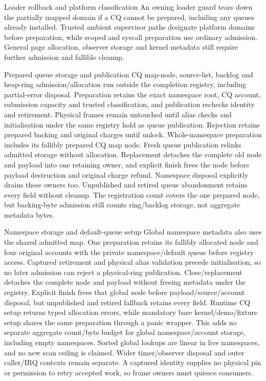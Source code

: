 \begin{implementationdetail}{Loader rollback and platform classification}
An owning loader guard tears down the partially mapped domain if a CQ cannot
be prepared, including any queues already installed. Trusted ambient supervisor
paths designate platform domains before preparation, while scoped and syscall
preparation use ordinary admission. General page allocation, observer storage
and kernel metadata still require further admission and fallible cleanup.
\end{implementationdetail}

\begin{implementationdetail}{Prepared queue storage and publication}
CQ map-node, source-list, backlog and heap-ring admission/allocation run outside the
completion registry, including partial-error disposal. Preparation retains the
exact namespace root, CQ account, submission capacity and trusted classification, and
publication rechecks identity and retirement. Physical frames remain untouched
until alias checks and initialisation under the same registry hold as queue
publication. Rejection retains prepared backing and original charges until
unlock. Whole-namespace preparation includes its fallibly prepared CQ map node.
Fresh queue publication relinks admitted storage without allocation. Replacement
detaches the complete old node and payload into one retaining owner, and explicit
finish frees the node before payload destruction and original charge refund.
Namespace disposal explicitly drains these owners too. Unpublished and retired
queue abandonment retains every field without cleanup. The registration count
covers the one prepared node, but backing-byte admission still counts ring/backlog
storage, not aggregate metadata bytes.
\end{implementationdetail}

\begin{implementationdetail}{Namespace storage and default-queue setup}
Global namespace metadata also uses the shared admitted map. One preparation
retains its fallibly allocated node and four original accounts with the private
namespace/default queue before registry access. Captured retirement and physical
alias validation precede initialisation, so no later admission can reject a
physical-ring publication. Close/replacement detaches the complete node and
payload without freeing metadata under the registry. Explicit finish frees that
global node before payload/source/account disposal, but unpublished and retired
fallback retains every field. Runtime CQ setup returns typed allocation errors, while
mandatory bare kernel/demo/fixture setup shares the same preparation through
a panic wrapper. This adds no separate aggregate count/byte budget for global
namespace/account storage, including empty namespaces. Sorted global lookups
are linear in live namespaces, and no new scan ceiling is claimed. Wider
timer/observer disposal and outer caller/IRQ contexts remain separate.
A captured identity supplies no physical
pin or permission to retry accepted work, so frame owners must quiesce consumers.
\end{implementationdetail}

